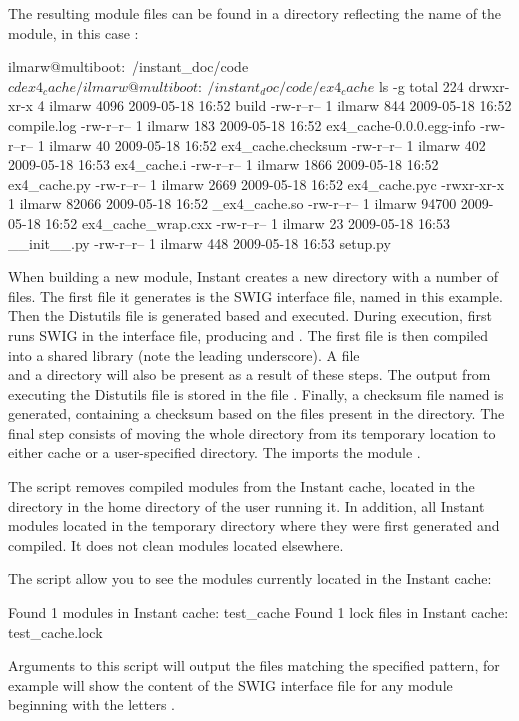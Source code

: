 The resulting module files can be found in a directory reflecting the name of
the module, in this case :
\begin{code}
ilmarw@multiboot:~/instant_doc/code$ cd ex4_cache/
ilmarw@multiboot:~/instant_doc/code/ex4_cache$ ls -g
total 224
drwxr-xr-x 4 ilmarw  4096 2009-05-18 16:52 build
-rw-r--r-- 1 ilmarw   844 2009-05-18 16:52 compile.log
-rw-r--r-- 1 ilmarw   183 2009-05-18 16:52 ex4_cache-0.0.0.egg-info
-rw-r--r-- 1 ilmarw    40 2009-05-18 16:52 ex4_cache.checksum
-rw-r--r-- 1 ilmarw   402 2009-05-18 16:53 ex4_cache.i
-rw-r--r-- 1 ilmarw  1866 2009-05-18 16:52 ex4_cache.py
-rw-r--r-- 1 ilmarw  2669 2009-05-18 16:52 ex4_cache.pyc
-rwxr-xr-x 1 ilmarw 82066 2009-05-18 16:52 _ex4_cache.so
-rw-r--r-- 1 ilmarw 94700 2009-05-18 16:52 ex4_cache_wrap.cxx
-rw-r--r-- 1 ilmarw    23 2009-05-18 16:53 __init__.py
-rw-r--r-- 1 ilmarw   448 2009-05-18 16:53 setup.py
\end{code} 
When building a new module, Instant creates a new directory with 
a number of files. The first file it generates is the SWIG interface file, named
 in this example. Then the Distutils file  is generated based
and executed. During execution,  first runs SWIG in the interface file, 
producing  and . The first file
is then compiled into a shared library  
(note the leading underscore). A file \\
and a directory  will also be present as a result of these
steps. The output from executing the Distutils file is stored in the file
.  Finally, a checksum file named
 is generated, containing a checksum based on
the files present in the directory. The final step consists of moving the whole
directory from its temporary location to either cache or a user-specified
directory. The  imports the module . 


The script  removes
compiled modules from the Instant cache, located in the directory
 in the home directory of the user running it. In addition, all
Instant modules located in the temporary directory where they were first
generated and compiled. It does not clean modules located elsewhere.

The script  allow you to see the modules currently located in the
Instant cache:
\begin{code}
Found 1 modules in Instant cache:
test_cache
Found 1 lock files in Instant cache:
test_cache.lock
\end{code}
Arguments to this script will output the files matching the specified pattern,
for example will  show the content of the
SWIG interface file for any module beginning with the letters .

